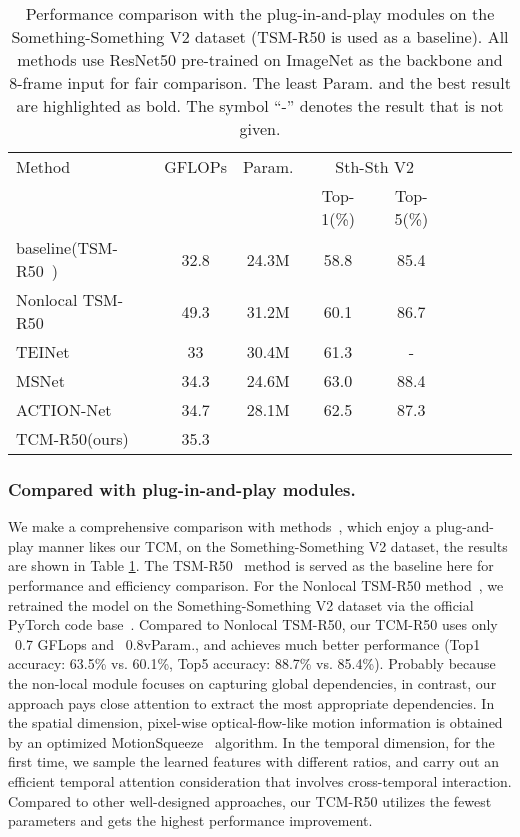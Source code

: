 \documentclass[journal]{IEEEtran}
\begin{document}
\begin{table}[!htbp]
\caption{Performance comparison with the plug-in-and-play modules on the Something-Something V2 dataset (TSM-R50 is used as a baseline). All methods use ResNet50 pre-trained on ImageNet as the backbone and 8-frame input for fair comparison. The least Param. and the best result are highlighted as bold. The symbol ``-” denotes the result that is not given.}
\label{tab:plugin}
\centering
\begin{tabular}{lcccccccc}
\hline
Method                           & GFLOPs & Param.           & \multicolumn{2}{c}{Sth-Sth V2}  \\
                                 &       &         & Top-1(\%)          & Top-5(\%)    \\ \hline
baseline(TSM-R50~\cite{lin2019tsm})            & 32.8    & 24.3M   & 58.8           & 85.4   \\ \hline
Nonlocal TSM-R50~\cite{lin2019tsm}           & 49.3    & 31.2M   & 60.1           & 86.7   \\
TEINet~\cite{liu2020teinet}      & 33  & 30.4M   & 61.3           & -                \\
MSNet~\cite{kwon2020motionsqueeze} & 34.3  & 24.6M   & 63.0   & 88.4 \\
ACTION-Net~\cite{wang2021action} & 34.7  & 28.1M   & 62.5   & 87.3 \\
TCM-R50(ours)  &     35.3  &           &            &                 \\ \hline
\end{tabular}
\end{table}

\subsubsection{Compared with plug-in-and-play modules.}
We make a comprehensive comparison with methods~\cite{lin2019tsm,liu2020teinet,kwon2020motionsqueeze,wang2021action}, which enjoy a plug-and-play manner likes our TCM, on the Something-Something V2 dataset, the results are shown in Table \ref{tab:plugin}. The TSM-R50~\cite{lin2019tsm} method is served as the baseline here for performance and efficiency comparison. For the Nonlocal TSM-R50 method~\cite{lin2019tsm}, we retrained the model on the Something-Something V2 dataset via the official PyTorch code base~\cite{lin2019tsm}. Compared to Nonlocal TSM-R50, our TCM-R50 uses only ~0.7 GFLops and ~0.8vParam., and achieves much better performance (Top1 accuracy: 63.5\% vs. 60.1\%, Top5 accuracy: 88.7\% vs. 85.4\%). Probably because the non-local module focuses on capturing global dependencies, in contrast, our approach pays close attention to extract the most appropriate dependencies. In the spatial dimension, pixel-wise optical-flow-like motion information is obtained by an optimized MotionSqueeze~\cite{kwon2020motionsqueeze} algorithm. In the temporal dimension, for the first time, we sample the learned features with different ratios, and carry out an efficient temporal attention consideration that involves cross-temporal interaction. Compared to other well-designed approaches, our TCM-R50 utilizes the fewest parameters and gets the highest performance improvement.
\end{document}
